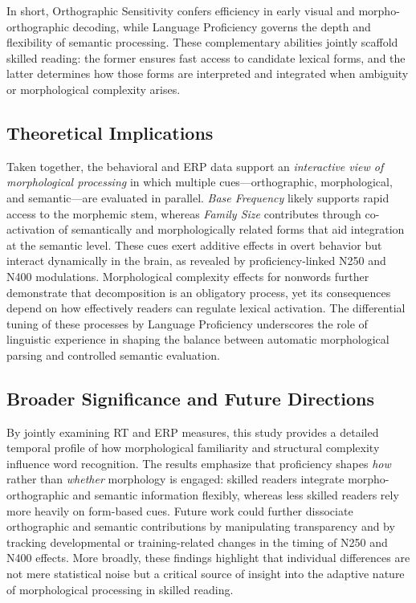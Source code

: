 \documentclass[preprint,12pt, authoryear, review]{elsarticle}
\begin{document}
In short, Orthographic Sensitivity confers efficiency in early visual and morpho-orthographic decoding, while Language Proficiency governs the depth and flexibility of semantic processing. These complementary abilities jointly scaffold skilled reading: the former ensures fast access to candidate lexical forms, and the latter determines how those forms are interpreted and integrated when ambiguity or morphological complexity arises.


\subsection{Theoretical Implications}

Taken together, the behavioral and ERP data support an \textit{interactive view of morphological processing} in which multiple cues—orthographic, morphological, and semantic—are evaluated in parallel. \textit{Base Frequency} likely supports rapid access to the morphemic stem, whereas \textit{Family Size} contributes through co-activation of semantically and morphologically related forms that aid integration at the semantic level. These cues exert additive effects in overt behavior but interact dynamically in the brain, as revealed by proficiency-linked N250 and N400 modulations. Morphological complexity effects for nonwords further demonstrate that decomposition is an obligatory process, yet its consequences depend on how effectively readers can regulate lexical activation. The differential tuning of these processes by Language Proficiency underscores the role of linguistic experience in shaping the balance between automatic morphological parsing and controlled semantic evaluation.

\subsection{Broader Significance and Future Directions}

By jointly examining RT and ERP measures, this study provides a detailed temporal profile of how morphological familiarity and structural complexity influence word recognition. The results emphasize that proficiency shapes \textit{how} rather than \textit{whether} morphology is engaged: skilled readers integrate morpho-orthographic and semantic information flexibly, whereas less skilled readers rely more heavily on form-based cues. Future work could further dissociate orthographic and semantic contributions by manipulating transparency and by tracking developmental or training-related changes in the timing of N250 and N400 effects. More broadly, these findings highlight that individual differences are not mere statistical noise but a critical source of insight into the adaptive nature of morphological processing in skilled reading.




\end{document}
